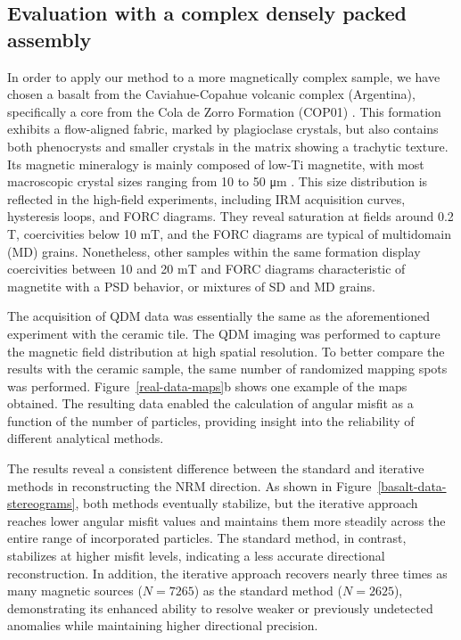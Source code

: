 \subsection{Evaluation with a complex densely packed assembly}

In order to apply our method to a more magnetically complex sample, we have chosen a basalt from the Caviahue-Copahue volcanic complex (Argentina), specifically a core from the Cola de Zorro Formation (COP01) \citep{Moncinhatto2019}. This formation exhibits a flow-aligned fabric, marked by plagioclase crystals, but also contains both phenocrysts and smaller crystals in the matrix showing a trachytic texture. Its magnetic mineralogy is mainly composed of low-Ti magnetite, with most macroscopic crystal sizes ranging from 10 to 50 \si{\micro\meter} \citep{Moncinhatto2019}. This size distribution is reflected in the high-field experiments, including IRM acquisition curves, hysteresis loops, and FORC diagrams. They reveal saturation at fields around 0.2 \si{T}, coercivities below 10 \si{mT}, and the FORC diagrams are typical of multidomain (MD) grains. Nonetheless, other samples within the same formation display coercivities between 10 and 20 \si{mT} and FORC diagrams characteristic of magnetite with a PSD behavior, or mixtures of SD and MD grains.

The acquisition of QDM data was essentially the same as the aforementioned experiment with the ceramic tile. The QDM imaging was performed to capture the magnetic field distribution at high spatial resolution. To better compare the results with the ceramic sample, the same number of randomized mapping spots was performed. Figure~\ref{real-data-maps}b shows one example of the maps obtained. The resulting data enabled the calculation of angular misfit as a function of the number of particles, providing insight into the reliability of different analytical methods.

The results reveal a consistent difference between the standard and iterative methods in reconstructing the NRM direction. As shown in Figure~\ref{basalt-data-stereograms}, both methods eventually stabilize, but the iterative approach reaches lower angular misfit values and maintains them more steadily across the entire range of incorporated particles. The standard method, in contrast, stabilizes at higher misfit levels, indicating a less accurate directional reconstruction. In addition, the iterative approach recovers nearly three times as many magnetic sources (\(N=7265\)) as the standard method (\(N=2625\)), demonstrating its enhanced ability to resolve weaker or previously undetected anomalies while maintaining higher directional precision.

